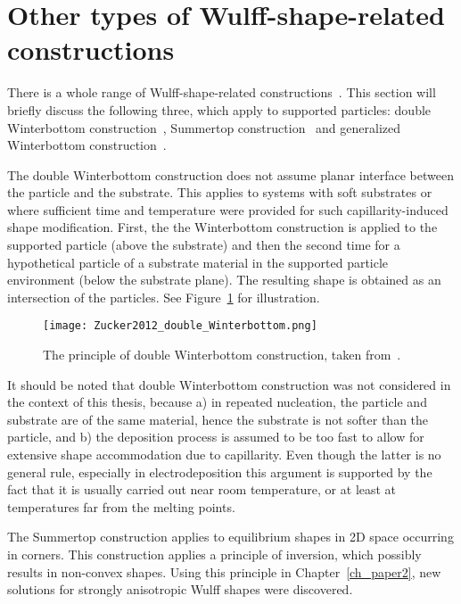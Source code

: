 \section{Other types of Wulff-shape-related constructions}
There is a whole range of Wulff-shape-related constructions~\cite{Boukouvala2021}. This section will briefly discuss the following three, which apply to supported particles: double Winterbottom construction~\cite{Zucker2012}, Summertop construction~\cite{Zia1988} and generalized Winterbottom construction~\cite{Bao2017}.

The double Winterbottom construction does not assume planar interface between the particle and the substrate. This applies to systems with soft substrates or where sufficient time and temperature were provided for such capillarity-induced shape modification. First, the the Winterbottom construction is applied to the supported particle (above the substrate) and then the second time for a hypothetical particle of a substrate material in the supported particle environment (below the substrate plane). The resulting shape is obtained as an intersection of the particles. See Figure~\ref{fig_double_Winterbottom} for illustration.
\begin{figure}
	\centering
	\texttt{[image: Zucker2012\_double\_Winterbottom.png]}
	\caption[Double Winterbottom construction]{The principle of double Winterbottom construction, taken from~\cite{Zucker2012}.}
	\label{fig_double_Winterbottom}
\end{figure}
It should be noted that double Winterbottom construction was not considered in the context of this thesis, because a) in repeated nucleation, the particle and substrate are of the same material, hence the substrate is not softer than the particle, and b) the deposition process is assumed to be too fast to allow for extensive shape accommodation due to capillarity. Even though the latter is no general rule, especially in electrodeposition this argument is supported by the fact that it is usually carried out near room temperature, or at least at temperatures far from the melting points.

The Summertop construction applies to equilibrium shapes in 2D space occurring in corners. This construction applies a principle of inversion, which possibly results in non-convex shapes. Using this principle in Chapter~\ref{ch_paper2}, new solutions for strongly anisotropic Wulff shapes were discovered.

